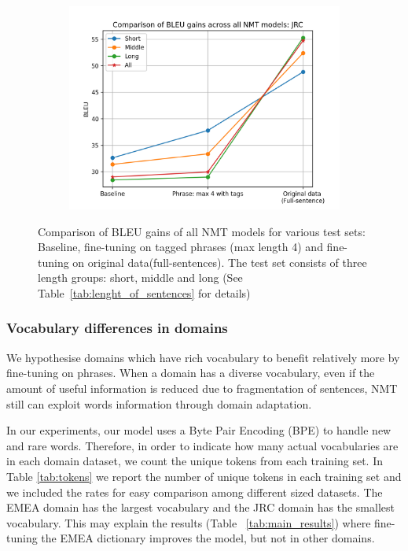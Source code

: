 \begin{figure}[h!]
\begin{subfigure}{.48\textwidth}
  \includegraphics[scale=0.48]{images/JRC_different_lengths.png}
    \caption{}
    \label{fig:JRC_different_lengths}
\end{subfigure}
\caption{Comparison of BLEU gains of all NMT models for various test sets: Baseline, fine-tuning on tagged phrases (max length 4) and fine-tuning on original data(full-sentences). The test set consists of three length groups: short, middle and long (See Table~\ref{tab:lenght_of_sentences} for details)}
\label{fig:different_lengths}
\end{figure}


\subsubsection{Vocabulary differences in domains}

We hypothesise domains which have rich vocabulary to benefit relatively more by fine-tuning on phrases. 
When a domain has a diverse vocabulary, even if the amount of useful information is reduced due to fragmentation of sentences, NMT still can exploit words information through domain adaptation. 

In our experiments, our model uses a Byte Pair Encoding (BPE) to handle new and rare words. Therefore, in order to indicate how many actual vocabularies are in each domain dataset, we count the unique tokens from each training set. In Table \ref{tab:tokens} we report the number of unique tokens in each training set and we included the rates for easy comparison among different sized datasets. The EMEA domain has the largest vocabulary and the JRC domain has the smallest vocabulary. This may explain the results (Table ~\ref{tab:main_results}) where fine-tuning the EMEA dictionary improves the model, but not in other domains.

